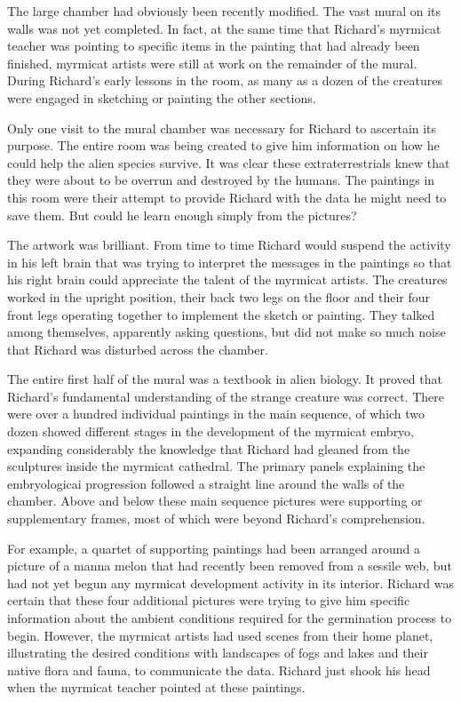 \documentclass[]{article}
\begin{document}
{{The large chamber had obviously been recently modified. The vast mural on its walls was not yet completed. In fact, at the same time that Richard’s myrmicat teacher was pointing to specific items in the painting that had already been finished, myrmicat artists were still at work on the remainder of the mural. During Richard’s early lessons in the room, as many as a dozen of the creatures were engaged in sketching or painting the other sections.

Only one visit to the mural chamber was necessary for Richard to ascertain its purpose. The entire room was being created to give him information on how he could help the alien species survive. It was clear these extraterrestrials knew that they were about to be overrun and destroyed by the humans. The paintings in this room were their attempt to provide Richard with the data he might need to save them. But could he learn enough simply from the pictures?

The artwork was brilliant. From time to time Richard would suspend the activity in his left brain that was trying to interpret the messages in the paintings so that his right brain could appreciate the talent of the myrmicat artists. The creatures worked in the upright position, their back two legs on the floor and their four front legs operating together to implement the sketch or painting. They talked among themselves, apparently asking questions, but did not make so much noise that Richard was disturbed across the chamber.

The entire first half of the mural was a textbook in alien biology. It proved that Richard’s fundamental understanding of the strange creature was correct. There were over a hundred individual paintings in the main sequence, of which two dozen showed different stages in the development of the myrmicat embryo, expanding considerably the knowledge that Richard had gleaned from the sculptures inside the myrmicat cathedral. The primary panels explaining the embryologicai progression followed a straight line around the walls of the chamber. Above and below these main sequence pictures were supporting or supplementary frames, most of which were beyond Richard’s comprehension.

For example, a quartet of supporting paintings had been arranged around a picture of a manna melon that had recently been removed from a sessile web, but had not yet begun any myrmicat development activity in its interior. Richard was certain that these four additional pictures were trying to give him specific information about the ambient conditions required for the germination process to begin. However, the myrmicat artists had used scenes from their home planet, illustrating the desired conditions with landscapes of fogs and lakes and their native flora and fauna, to communicate the data. Richard just shook his head when the myrmicat teacher pointed at these paintings.

}}
\end{document}
